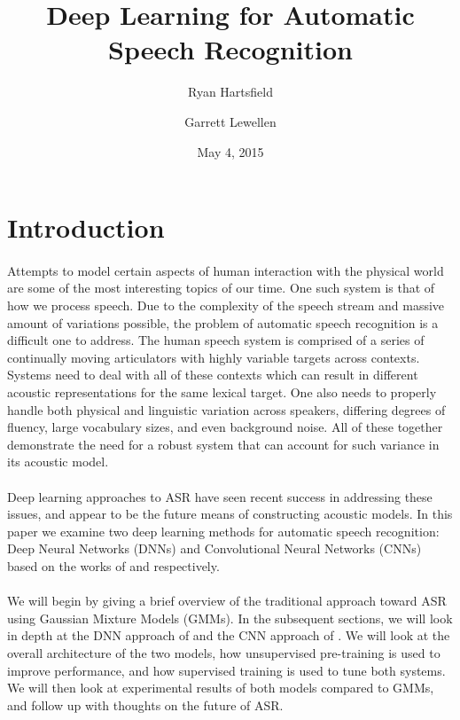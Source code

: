 \documentclass[letterpaper]{article}
\begin{document}
\title{Deep Learning for Automatic Speech Recognition}
\author{Ryan Hartsfield \and Garrett Lewellen}
\date{May 4, 2015}

\maketitle

\doublespacing

\section*{Introduction}

\paragraph{} Attempts to model certain aspects of human interaction with the physical world are some of the most interesting topics of our time. One such system is that of how we process speech. Due to the complexity of the speech stream and massive amount of variations possible, the problem of automatic speech recognition is a difficult one to address. The human speech system is comprised of a series of continually moving articulators with highly variable targets across contexts. Systems need to deal with all of these contexts which can result in different acoustic representations for the same lexical target. One also needs to properly handle both physical and linguistic variation across speakers, differing degrees of fluency, large vocabulary sizes, and even background noise. All of these together demonstrate the need for a robust system that can account for such variance in its acoustic model.

\paragraph{} Deep learning approaches to ASR have seen recent success in addressing these issues, and appear to be the future means of constructing acoustic models. In this paper we examine two deep learning methods for automatic speech recognition: Deep Neural Networks (DNNs) and Convolutional Neural Networks (CNNs) based on the works of \cite{DBLP:journals/taslp/DahlYDA12} and  \cite{DBLP:journals/taslp/Abdel-HamidMJDPY14} respectively. 

\paragraph{} We will begin by giving a brief overview of the traditional approach toward ASR using Gaussian Mixture Models (GMMs). In the subsequent sections, we will look in depth at the DNN approach of \cite{DBLP:journals/taslp/DahlYDA12} and the CNN approach of \cite{DBLP:journals/taslp/Abdel-HamidMJDPY14}. We will look at the overall architecture of the two models, how unsupervised pre-training is used to improve performance, and how supervised training is used to tune both systems. We will then look at experimental results of both models compared to GMMs, and follow up with thoughts on the future of ASR. 
\end{document}
